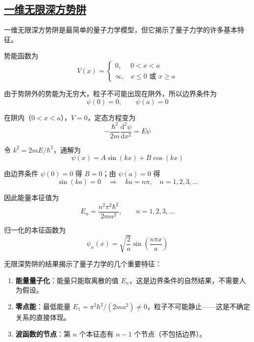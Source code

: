 \subsection{\protect\hyperlink{:}{一维无限深方势阱}}

一维无限深方势阱是最简单的量子力学模型，但它揭示了量子力学的许多基本特征。

\begin{definition}[一维无限深方势阱]
    势能函数为
    \begin{equation}
        V(x) = \begin{cases} 0, & 0 < x < a \\ \infty, & x \leq 0 \text{ 或 } x \geq a \end{cases}
    \end{equation}
\end{definition}

由于势阱外的势能为无穷大，粒子不可能出现在阱外，所以边界条件为
\begin{equation}
    \psi(0) = 0, \qquad \psi(a) = 0
\end{equation}

在阱内（$0 < x < a$），$V = 0$，定态方程变为
\begin{equation}
    -\frac{\hbar^2}{2m}\frac{\mathrm{d}^2\psi}{\mathrm{d}x^2} = E\psi
\end{equation}

令 $k^2 = 2mE/\hbar^2$，通解为
\begin{equation}
    \psi(x) = A\sin(kx) + B\cos(kx)
\end{equation}

由边界条件 $\psi(0) = 0$ 得 $B = 0$；由 $\psi(a) = 0$ 得
\begin{equation}
    \sin(ka) = 0 \quad \Longrightarrow \quad ka = n\pi, \quad n = 1, 2, 3, \ldots
\end{equation}

因此能量本征值为
\begin{equation}
    \boxed{E_n = \frac{n^2\pi^2\hbar^2}{2ma^2}, \qquad n = 1, 2, 3, \ldots}
\end{equation}

归一化的本征函数为
\begin{equation}
    \psi_n(x) = \sqrt{\frac{2}{a}}\sin\left(\frac{n\pi x}{a}\right)
\end{equation}

\begin{remark}
    无限深势阱的结果揭示了量子力学的几个重要特征：
    \begin{enumerate}
        \item \textbf{能量量子化}：能量只能取离散的值 $E_n$，这是边界条件的自然结果，不需要人为假设。
        \item \textbf{零点能}：最低能量 $E_1 = \pi^2\hbar^2/(2ma^2) \neq 0$，粒子不可能静止——这是不确定关系的直接体现。
        \item \textbf{波函数的节点}：第 $n$ 个本征态有 $n-1$ 个节点（不包括边界）。
    \end{enumerate}
\end{remark}

